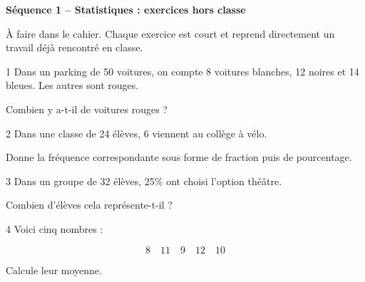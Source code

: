 \documentclass[9.5pt,a4paper,landscape]{article}
\begin{document}
\fontsize{9}{10.5}\selectfont

\begin{center}
{\large\bfseries\color{bleu}
Séquence 1 -- Statistiques : exercices hors classe}\par

\vspace{0.1em}

{\small
À faire dans le cahier.
Chaque exercice est court et reprend directement un travail déjà rencontré en classe.}
\end{center}

\vspace{0.25em}


\noindent
\begin{minipage}[t]{0.242\linewidth}
\begin{exo}{1}
Dans un parking de 50 voitures, on compte 8 voitures blanches,
12 noires et 14 bleues. Les autres sont rouges.

\medskip
Combien y a-t-il de voitures rouges ?
\end{exo}
\end{minipage}
\hfill
%
\begin{minipage}[t]{0.242\linewidth}
\begin{exo}{2}
Dans une classe de 24 élèves, 6 viennent au collège à vélo.

\medskip
Donne la fréquence correspondante sous forme de fraction puis de pourcentage.
\end{exo}
\end{minipage}
\hfill
%
\begin{minipage}[t]{0.242\linewidth}
\begin{exo}{3}
Dans un groupe de 32 élèves, 25\% ont choisi l'option théâtre.

\medskip
Combien d'élèves cela représente-t-il ?
\end{exo}
\end{minipage}
\hfill
%
\begin{minipage}[t]{0.242\linewidth}
\begin{exo}{4}
Voici cinq nombres :

\[
8\quad 11\quad 9\quad 12\quad 10
\]

Calcule leur moyenne.
\end{exo}
\end{minipage}

\vspace{0.16cm}
\end{document}
